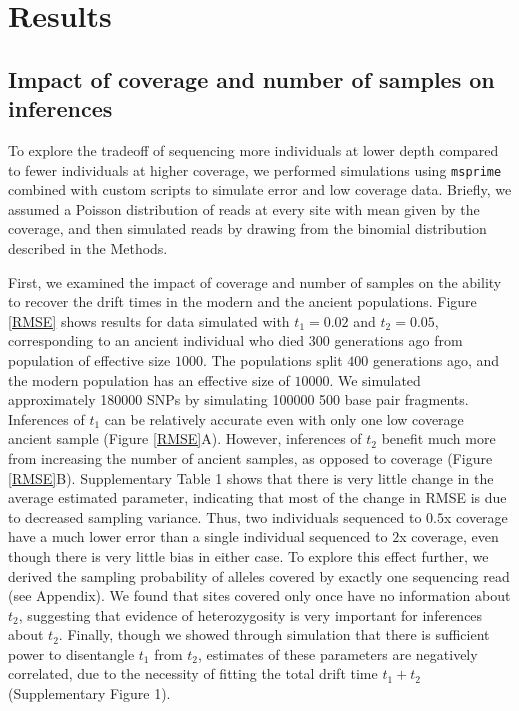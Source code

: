\documentclass[11pt, oneside]{article}   	%
\begin{document}
\section{Results}

\subsection{Impact of coverage and number of samples on inferences}

To explore the tradeoff of sequencing more individuals at lower depth compared to fewer individuals at higher coverage, we performed simulations using \texttt{msprime} \citep{kelleher2016efficient} combined with custom scripts to simulate error and low coverage data. Briefly, we assumed a Poisson distribution of reads at every site with mean given by the coverage, and then simulated reads by drawing from the binomial distribution described in the Methods.

 First, we examined the impact of coverage and number of samples on the ability to recover the drift times in the modern and the ancient populations. Figure \ref{RMSE} shows results for data simulated with $t_1 = 0.02$ and $t_2 = 0.05$, corresponding to an ancient individual who died $300$ generations ago from population of effective size $1000$. The populations split $400$ generations ago, and the modern population has an effective size of $10000$. We simulated approximately 180000 SNPs by simulating 100000 500 base pair fragments. Inferences of $t_1$ can be relatively accurate even with only one low coverage ancient sample (Figure \ref{RMSE}A). However, inferences of $t_2$ benefit much more from increasing the number of ancient samples, as opposed to coverage (Figure \ref{RMSE}B). Supplementary Table 1 shows that there is very little change in the average estimated parameter, indicating that most of the change in RMSE is due to decreased sampling variance. Thus, two individuals sequenced to $0.5$x coverage have a much lower error than a single individual sequenced to $2$x coverage, even though there is very little bias in either case. To explore this effect further, we derived the sampling probability of alleles covered by exactly one sequencing read (see Appendix). We found that sites covered only once have no information about $t_2$, suggesting that evidence of  heterozygosity is very important for inferences about $t_2$. Finally, though we showed through simulation that there is sufficient power to disentangle $t_1$ from $t_2$, estimates of these parameters are negatively correlated, due to the necessity of fitting the total drift time $t_1 + t_2$ (Supplementary Figure 1).
\end{document}
